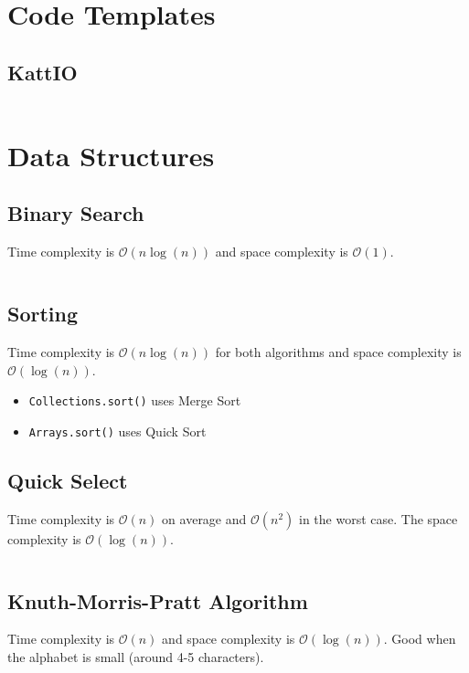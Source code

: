 \documentclass[8pt,a4paper,landscape,oneside]{amsart}
\newcommand{\code}[1]{\inputminted[fontsize=\normalsize,baselinestretch=1]{java}{code/#1}}
\newcommand{\bigO}{\mathcal{O}}
\begin{document}
\begin{multicols*}{3}
\thispagestyle{fancy}
\vspace{-3em}

\tableofcontents
\section{Code Templates}
  \subsection{KattIO}
  \code{Kattio.java}
  
  
\section{Data Structures}
  \subsection{Binary Search}
  Time complexity is $\bigO(n \log(n))$ and space complexity is $\bigO(1)$.
  \code{Structures/BinarySearch.java}
  \subsection{Sorting}
  Time complexity is $\bigO(n \log(n))$ for both algorithms and space complexity is $\bigO(\log(n))$.
  \begin{itemize}
  \item \texttt{Collections.sort()} uses Merge Sort
  \item \texttt{Arrays.sort()} uses Quick Sort
  \end{itemize}
  
  \subsection{Quick Select}
  Time complexity is $\bigO(n)$ on average and $\bigO(n^2)$ in the worst case. The space complexity is $\bigO(\log(n))$.
  \code{Structures/QuickSelect.java}
  
  \subsection{Knuth-Morris-Pratt Algorithm}
  Time complexity is $\bigO(n)$ and space complexity is $\bigO(\log(n))$. Good when the alphabet is small (around 4-5 characters).
  \code{Structures/KMP.java}
  

\end{multicols*}
\end{document}
